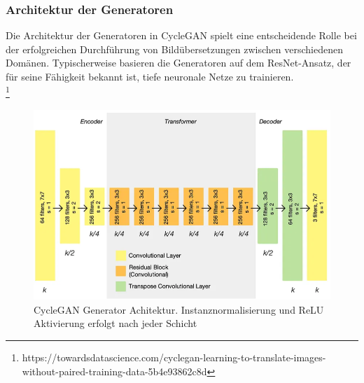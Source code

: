 \subsubsection{Architektur der Generatoren}
Die Architektur der Generatoren in CycleGAN spielt eine entscheidende Rolle bei der erfolgreichen Durchführung von Bildübersetzungen zwischen verschiedenen Domänen. Typischerweise basieren die Generatoren auf dem ResNet-Ansatz, der für seine Fähigkeit bekannt ist, tiefe neuronale Netze zu trainieren\cite{He.2015}.
\\
\footnote[1]{https://towardsdatascience.com/cyclegan-learning-to-translate-images-without-paired-training-data-5b4e93862c8d}

\begin{figure}[ht]
	\centering
	\includegraphics[width=0.8\linewidth]{./images/cycleGanGeneratorArchitecture.png}
	\caption{CycleGAN Generator Achitektur. Instanznormalisierung und ReLU Aktivierung erfolgt nach jeder Schicht
	\protect\footnotemark[1]}
	\label{fig:cycleGanGeneratorArchitecture}
\end{figure}

